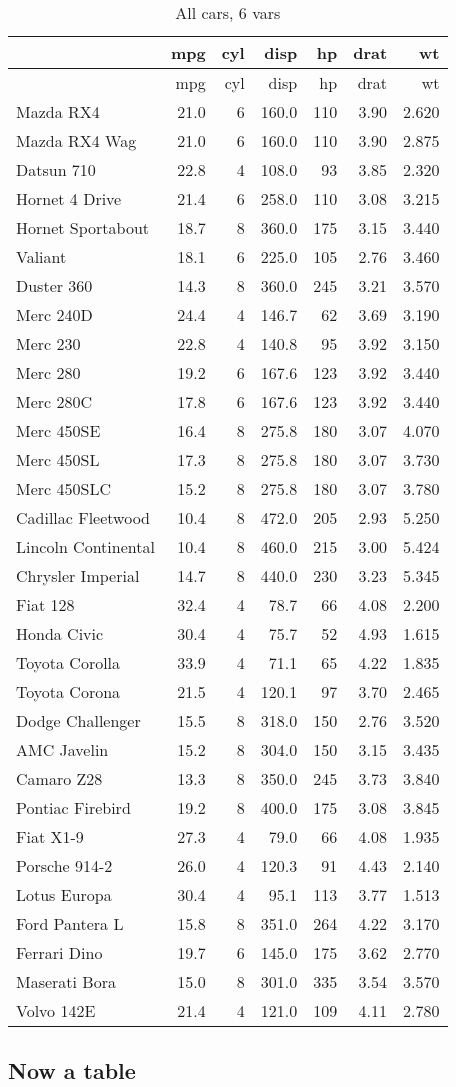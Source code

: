 \documentclass[]{article}
\begin{document}
\begin{longtable}[]{@{}lrrrrrr@{}}
\caption{All cars, 6 vars}\tabularnewline
\toprule
& mpg & cyl & disp & hp & drat & wt\tabularnewline
\midrule
\endfirsthead
\toprule
& mpg & cyl & disp & hp & drat & wt\tabularnewline
\midrule
\endhead
Mazda RX4 & 21.0 & 6 & 160.0 & 110 & 3.90 & 2.620\tabularnewline
Mazda RX4 Wag & 21.0 & 6 & 160.0 & 110 & 3.90 & 2.875\tabularnewline
Datsun 710 & 22.8 & 4 & 108.0 & 93 & 3.85 & 2.320\tabularnewline
Hornet 4 Drive & 21.4 & 6 & 258.0 & 110 & 3.08 & 3.215\tabularnewline
Hornet Sportabout & 18.7 & 8 & 360.0 & 175 & 3.15 & 3.440\tabularnewline
Valiant & 18.1 & 6 & 225.0 & 105 & 2.76 & 3.460\tabularnewline
Duster 360 & 14.3 & 8 & 360.0 & 245 & 3.21 & 3.570\tabularnewline
Merc 240D & 24.4 & 4 & 146.7 & 62 & 3.69 & 3.190\tabularnewline
Merc 230 & 22.8 & 4 & 140.8 & 95 & 3.92 & 3.150\tabularnewline
Merc 280 & 19.2 & 6 & 167.6 & 123 & 3.92 & 3.440\tabularnewline
Merc 280C & 17.8 & 6 & 167.6 & 123 & 3.92 & 3.440\tabularnewline
Merc 450SE & 16.4 & 8 & 275.8 & 180 & 3.07 & 4.070\tabularnewline
Merc 450SL & 17.3 & 8 & 275.8 & 180 & 3.07 & 3.730\tabularnewline
Merc 450SLC & 15.2 & 8 & 275.8 & 180 & 3.07 & 3.780\tabularnewline
Cadillac Fleetwood & 10.4 & 8 & 472.0 & 205 & 2.93 &
5.250\tabularnewline
Lincoln Continental & 10.4 & 8 & 460.0 & 215 & 3.00 &
5.424\tabularnewline
Chrysler Imperial & 14.7 & 8 & 440.0 & 230 & 3.23 & 5.345\tabularnewline
Fiat 128 & 32.4 & 4 & 78.7 & 66 & 4.08 & 2.200\tabularnewline
Honda Civic & 30.4 & 4 & 75.7 & 52 & 4.93 & 1.615\tabularnewline
Toyota Corolla & 33.9 & 4 & 71.1 & 65 & 4.22 & 1.835\tabularnewline
Toyota Corona & 21.5 & 4 & 120.1 & 97 & 3.70 & 2.465\tabularnewline
Dodge Challenger & 15.5 & 8 & 318.0 & 150 & 2.76 & 3.520\tabularnewline
AMC Javelin & 15.2 & 8 & 304.0 & 150 & 3.15 & 3.435\tabularnewline
Camaro Z28 & 13.3 & 8 & 350.0 & 245 & 3.73 & 3.840\tabularnewline
Pontiac Firebird & 19.2 & 8 & 400.0 & 175 & 3.08 & 3.845\tabularnewline
Fiat X1-9 & 27.3 & 4 & 79.0 & 66 & 4.08 & 1.935\tabularnewline
Porsche 914-2 & 26.0 & 4 & 120.3 & 91 & 4.43 & 2.140\tabularnewline
Lotus Europa & 30.4 & 4 & 95.1 & 113 & 3.77 & 1.513\tabularnewline
Ford Pantera L & 15.8 & 8 & 351.0 & 264 & 4.22 & 3.170\tabularnewline
Ferrari Dino & 19.7 & 6 & 145.0 & 175 & 3.62 & 2.770\tabularnewline
Maserati Bora & 15.0 & 8 & 301.0 & 335 & 3.54 & 3.570\tabularnewline
Volvo 142E & 21.4 & 4 & 121.0 & 109 & 4.11 & 2.780\tabularnewline
\bottomrule
\end{longtable}

\subsection{Now a table}\label{now-a-table-4}
\end{document}
